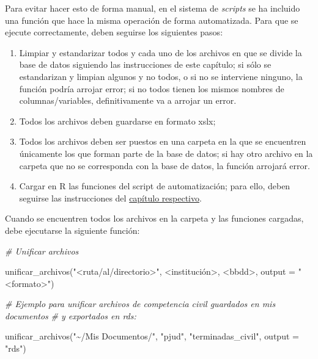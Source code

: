 \documentclass[
  spanish,
]{book}
\newenvironment{Shaded}{\begin{snugshade}}{\end{snugshade}}
\newcommand{\AttributeTok}[1]{\textcolor[rgb]{0.77,0.63,0.00}{#1}}
\newcommand{\CommentTok}[1]{\textcolor[rgb]{0.56,0.35,0.01}{\textit{#1}}}
\newcommand{\FunctionTok}[1]{\textcolor[rgb]{0.00,0.00,0.00}{#1}}
\newcommand{\NormalTok}[1]{#1}
\newcommand{\SpecialCharTok}[1]{\textcolor[rgb]{0.00,0.00,0.00}{#1}}
\newcommand{\StringTok}[1]{\textcolor[rgb]{0.31,0.60,0.02}{#1}}
\begin{document}
Para evitar hacer esto de forma manual, en el sistema de \emph{scripts} se ha incluido una función que hace la misma operación de forma automatizada. Para que se ejecute correctamente, deben seguirse los siguientes pasos:

\begin{enumerate}
\def\labelenumi{\arabic{enumi}.}
\item
  Limpiar y estandarizar todos y cada uno de los archivos en que se divide la base de datos siguiendo las instrucciones de este capítulo; si sólo se estandarizan y limpian algunos y no todos, o si no se interviene ninguno, la función podría arrojar error; si no todos tienen los mismos nombres de columnas/variables, definitivamente va a arrojar un error.
\item
  Todos los archivos deben guardarse en formato xslx;
\item
  Todos los archivos deben ser puestos en una carpeta en la que se encuentren únicamente los que forman parte de la base de datos; si hay otro archivo en la carpeta que no se corresponda con la base de datos, la función arrojará error.
\item
  Cargar en R las funciones del script de automatización; para ello, deben seguirse las instrucciones del \protect\hyperlink{estructura}{capítulo respectivo}.
\end{enumerate}

Cuando se encuentren todos los archivos en la carpeta y las funciones cargadas, debe ejecutarse la siguiente función:

\begin{Shaded}
\begin{Highlighting}[]
\CommentTok{\# Unificar archivos}

\FunctionTok{unificar\_archivos}\NormalTok{(}\StringTok{"\textless{}ruta/al/directorio\textgreater{}"}\NormalTok{, }\SpecialCharTok{\textless{}}\NormalTok{institución}\SpecialCharTok{\textgreater{}}\NormalTok{, }\SpecialCharTok{\textless{}}\NormalTok{bbdd}\SpecialCharTok{\textgreater{}}\NormalTok{, }\AttributeTok{output =} \StringTok{"\textless{}formato\textgreater{}"}\NormalTok{)}

\CommentTok{\# Ejemplo para unificar archivos de competencia civil guardados en mis documentos}
\CommentTok{\# y exportados en rds:}

\FunctionTok{unificar\_archivos}\NormalTok{(}\StringTok{"\textasciitilde{}/Mis Documentos/"}\NormalTok{, }\StringTok{"pjud"}\NormalTok{, }\StringTok{"terminadas\_civil"}\NormalTok{, }\AttributeTok{output =} \StringTok{"rds"}\NormalTok{)}
\end{Highlighting}
\end{Shaded}
\end{document}
